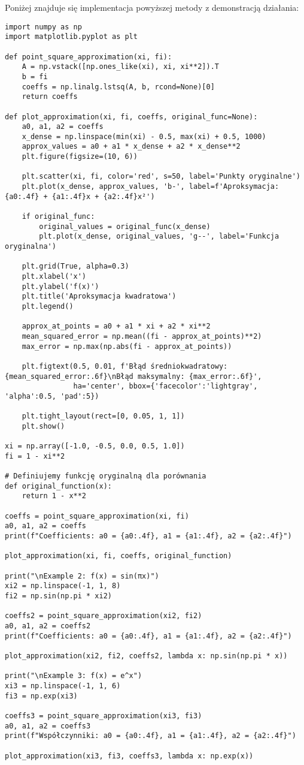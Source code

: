 \documentclass{article}
\begin{document}
Poniżej znajduje się implementacja powyższej metody z demonstracją działania:
\begin{verbatim}
import numpy as np
import matplotlib.pyplot as plt

def point_square_approximation(xi, fi):    
    A = np.vstack([np.ones_like(xi), xi, xi**2]).T
    b = fi
    coeffs = np.linalg.lstsq(A, b, rcond=None)[0]
    return coeffs

def plot_approximation(xi, fi, coeffs, original_func=None):
    a0, a1, a2 = coeffs
    x_dense = np.linspace(min(xi) - 0.5, max(xi) + 0.5, 1000)
    approx_values = a0 + a1 * x_dense + a2 * x_dense**2
    plt.figure(figsize=(10, 6))
    
    plt.scatter(xi, fi, color='red', s=50, label='Punkty oryginalne')
    plt.plot(x_dense, approx_values, 'b-', label=f'Aproksymacja: {a0:.4f} + {a1:.4f}x + {a2:.4f}x²')
    
    if original_func:
        original_values = original_func(x_dense)
        plt.plot(x_dense, original_values, 'g--', label='Funkcja oryginalna')
    
    plt.grid(True, alpha=0.3)
    plt.xlabel('x')
    plt.ylabel('f(x)')
    plt.title('Aproksymacja kwadratowa')
    plt.legend()

    approx_at_points = a0 + a1 * xi + a2 * xi**2
    mean_squared_error = np.mean((fi - approx_at_points)**2)
    max_error = np.max(np.abs(fi - approx_at_points))
    
    plt.figtext(0.5, 0.01, f'Błąd średniokwadratowy: {mean_squared_error:.6f}\nBłąd maksymalny: {max_error:.6f}', 
                ha='center', bbox={'facecolor':'lightgray', 'alpha':0.5, 'pad':5})
    
    plt.tight_layout(rect=[0, 0.05, 1, 1])
    plt.show()

xi = np.array([-1.0, -0.5, 0.0, 0.5, 1.0])
fi = 1 - xi**2

# Definiujemy funkcję oryginalną dla porównania
def original_function(x):
    return 1 - x**2

coeffs = point_square_approximation(xi, fi)
a0, a1, a2 = coeffs
print(f"Coefficients: a0 = {a0:.4f}, a1 = {a1:.4f}, a2 = {a2:.4f}")

plot_approximation(xi, fi, coeffs, original_function)

print("\nExample 2: f(x) = sin(πx)")
xi2 = np.linspace(-1, 1, 8)
fi2 = np.sin(np.pi * xi2)

coeffs2 = point_square_approximation(xi2, fi2)
a0, a1, a2 = coeffs2
print(f"Coefficients: a0 = {a0:.4f}, a1 = {a1:.4f}, a2 = {a2:.4f}")

plot_approximation(xi2, fi2, coeffs2, lambda x: np.sin(np.pi * x))

print("\nExample 3: f(x) = e^x")
xi3 = np.linspace(-1, 1, 6)
fi3 = np.exp(xi3)

coeffs3 = point_square_approximation(xi3, fi3)
a0, a1, a2 = coeffs3
print(f"Współczynniki: a0 = {a0:.4f}, a1 = {a1:.4f}, a2 = {a2:.4f}")

plot_approximation(xi3, fi3, coeffs3, lambda x: np.exp(x))

\end{verbatim}
\end{document}
